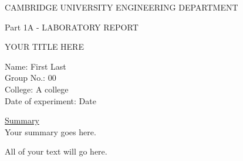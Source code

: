 \documentclass{report}					%
\begin{document}



\begin{titlepage} 						%
\centering								%

\vspace*{\fill}							%

\huge{CAMBRIDGE UNIVERSITY ENGINEERING DEPARTMENT}\\		%
\vspace{1 cm}

\LARGE{Part 1A - LABORATORY REPORT}
\vspace{2 cm}

\begin{mdframed}						%
\centering
\LARGE{YOUR TITLE HERE}
\end{mdframed}

\vspace{3 cm}

\begin{flushleft}
\large{Name: First Last\\				%
Group No.: 00 \\
College: A college\\
Date of experiment: Date\\}

\vspace{3 cm}
\underline{Summary}\\					%
Your summary goes here. 

\vspace*{\fill}	

\end{flushleft}
\end{titlepage}							%



All of your text will go here. 
\end{document}
